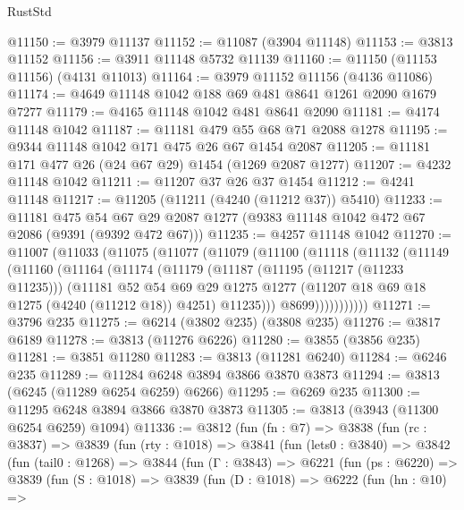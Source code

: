 \begin{lexlean}{RustStd}
\begin{coremodule}
{\begin{coremodule}
{{{{{{{{{{{{{{{{{{{{{{{{{{{{{{{{{{{@11150 := @3979 @11137
@11152 := @11087 (@3904 @11148)
@11153 := @3813 @11152
@11156 := @3911 @11148 @5732 @11139
@11160 := @11150 (@11153 @11156) (@4131 @11013)
@11164 := @3979 @11152 @11156 (@4136 @11086)
@11174 := @4649 @11148 @1042 @188 @69 @481 @8641 @1261 @2090 @1679 @7277
@11179 := @4165 @11148 @1042 @481 @8641 @2090
@11181 := @4174 @11148 @1042
@11187 := @11181 @479 @55 @68 @71 @2088 @1278
@11195 := @9344 @11148 @1042 @171 @475 @26 @67 @1454 @2087
@11205 := @11181 @171 @477 @26 (@24 @67 @29) @1454 (@1269 @2087 @1277)
@11207 := @4232 @11148 @1042
@11211 := @11207 @37 @26 @37 @1454
@11212 := @4241 @11148
@11217 := @11205 (@11211 (@4240 (@11212 @37)) @5410)
@11233 := @11181
    @475
    @54
    @67
    @29
    @2087
    @1277
    (@9383 @11148 @1042 @472 @67 @2086 (@9391 (@9392 @472 @67)))
@11235 := @4257 @11148 @1042
@11270 := @11007
    (@11033
      (@11075
        (@11077
          (@11079
            (@11100
              (@11118
                (@11132
                  (@11149
                    (@11160
                      (@11164
                        (@11174
                          (@11179
                            (@11187
                              (@11195 (@11217 (@11233 @11235)))
                              (@11181
                                @52
                                @54
                                @69
                                @29
                                @1275
                                @1277
                                (@11207 @18 @69 @18 @1275 (@4240 (@11212 @18)) @4251)
                                @11235)))
                          @8699)))))))))))
@11271 := @3796 @235
@11275 := @6214 (@3802 @235) (@3808 @235)
@11276 := @3817 @6189
@11278 := @3813 (@11276 @6226)
@11280 := @3855 (@3856 @235)
@11281 := @3851 @11280
@11283 := @3813 (@11281 @6240)
@11284 := @6246 @235
@11289 := @11284 @6248 @3894 @3866 @3870 @3873
@11294 := @3813 (@6245 (@11289 @6254 @6259) @6266)
@11295 := @6269 @235
@11300 := @11295 @6248 @3894 @3866 @3870 @3873
@11305 := @3813 (@3943 (@11300 @6254 @6259) @1094)
@11336 := @3812
    (fun (fn : @7) =>
    @3838
      (fun (rc : @3837) =>
      @3839
        (fun (rty : @1018) =>
        @3841
          (fun (lets0 : @3840) =>
          @3842
            (fun (tail0 : @1268) =>
            @3844
              (fun (Γ : @3843) =>
              @6221
                (fun (ps : @6220) =>
                @3839
                  (fun (S : @1018) =>
                  @3839
                    (fun (D : @1018) =>
                    @6222
                      (fun (hn : @10) =>
}}}}}}}}}}}}}}}}}}}}}}}}}}}}}}}}}}}
\end{coremodule}}
\end{coremodule}
\end{lexlean}
